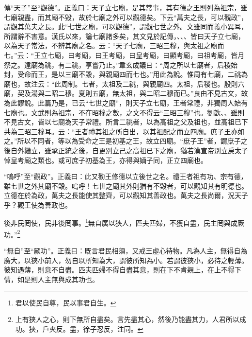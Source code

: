 {\noindent\zhuan{}\fzbyks 傳“天子”至“觀德”。正義曰：天子立七廟，是其常事，其有德之王則列為祖宗，雖七廟親盡，而其廟不毀，故於七廟之外可以觀德矣。下云“萬夫之長，可以觀政”，謂觀其萬夫之長。此“七世之廟，可以觀德”，謂觀七世之外。文雖同而義小異耳，所謂辭不害意。漢氏以來，論七廟諸多矣，其文見於記傳，、、、皆曰天子立七廟，以為天子常法，不辨其廟之名。云：“天子七廟，三昭三穆，與太祖之廟而七。”云：“王立七廟，曰考廟，曰王考廟，曰皇考廟，曰顯考廟，曰祖考廟，皆月祭之。遠廟為祧，有二祧，享嘗乃止。”韋玄成議曰：“周之所以七廟者，后稷始封，受命而王，是以三廟不毀，與親廟四而七也。”用此為說。惟周有七廟，二祧為廟也，故注云：“此周制。七者，太祖及二祧，與親廟四。太祖，后稷也。殷則六廟，契及湯與二昭二穆。夏則五廟，無太祖，與二昭二穆而已。”良由不見古文，故為此謬說。此篇乃是，已云“七世之廟”，則天子立七廟，王者常禮，非獨周人始有七廟也。文武則為祖宗，不在昭穆之數，之文不得云“三昭三穆”也。劉歆、、雖則不見古文，皆以七廟為天子常禮。所言二祧者，以為高祖之父及祖也，並高祖已下共為三昭三穆耳。云：“王者禘其祖之所自出，以其祖配之而立四廟。庶子王亦如之。”所以不同者，等以為受命之王是初基之王，故立四廟。“庶子王”者，謂庶子之後自外繼立，雖承正統之後，自更別立己之高祖已下之廟，猶若漢宣帝別立戾太子悼皇考廟之類也。或可庶子初基為王，亦得與嫡子同，正立四廟也。 \par}

{\noindent\shu{}\fzkt “嗚呼”至“觀政”。正義曰：此又勸王修德以立後世之名。禮王者祖有功、宗有德，雖七世之外其廟不毀。嗚呼！七世之廟其外則猶有不毀者，可以觀知其有明德也。立德在於為政，萬夫之長能使其整齊，可以觀知其善政也。萬夫之長尚爾，況天子乎？觀王使為善政也。 \par}

後非民罔使，民非後罔事。\footnote{君以使民自尊，民以事君自生。}無自廣以狹人，匹夫匹婦，不獲自盡，民主罔與成厥功。”\footnote{上有狹人之心，則下無所自盡矣。言先盡其心，然後乃能盡其力，人君所以成功。狹，戶夾反。盡，徐子忍反，注同。}

{\noindent\shu{}\fzkt “無自”至“厥功”。正義曰：既言君民相須，又戒王虛心待物。凡為人主，無得自為廣大，以狹小前人，勿自以所知為大，謂彼所知為小。若謂彼狹小，必待之輕薄。彼知遇薄，則意不自盡。匹夫匹婦不得自盡其意，則在下不肯親上，在上不得下情，如是則人主無與成其功也。 \par}

